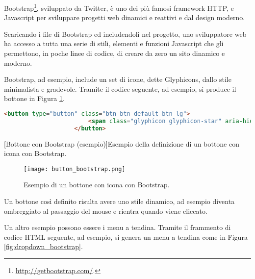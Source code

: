             Bootstrap\footnote{\url{http://getbootstrap.com/}.}, sviluppato da Twitter, è uno dei più famosi framework \ac{HTTP},  e Javascript per sviluppare progetti web dinamici e reattivi e dal design moderno.
            
            Scaricando i file di Bootstrap ed includendoli nel progetto, uno sviluppatore web ha accesso a tutta una serie di stili, elementi  e funzioni Javascript che gli permettono, in poche linee di codice, di creare da zero un sito dinamico e moderno.
            
            Bootstrap, ad esempio, include un set di icone, dette Glyphicons, dallo stile minimalista e gradevole. Tramite il codice seguente, ad esempio, si produce il bottone in Figura \ref{fig:button_bootstrap}.
            
            \begin{center}
                \begin{lstlisting}[language=html, gobble=18]
                    <button type="button" class="btn btn-default btn-lg">
                        <span class="glyphicon glyphicon-star" aria-hidden="true"></span> Star
                    </button>
                \end{lstlisting}
                \captionsetup{textformat=empty,labelformat=empty} \vspace{-2em}
                [Bottone con Bootstrap (esempio)]{Esempio della definizione di un bottone con icona con Bootstrap.}
            \end{center}
            
        	\begin{figure}[h!]
        		\begin{center}
        			\texttt{[image: button\_bootstrap.png]}
        		\end{center}
        		\caption[Bottone con Bootstrap (esempio)]{Esempio di un bottone con icona con Bootstrap.}
        		\label{fig:button_bootstrap}
        	\end{figure}
        	
        	Un bottone così definito risulta avere uno stile dinamico, ad esempio diventa ombreggiato al passaggio del mouse e rientra quando viene cliccato.
        	
        	Un altro esempio possono essere i menu a tendina. Tramite il frammento di codice \ac{HTML} seguente, ad esempio, si genera un menu a tendina come in Figura \ref{fig:dropdown_bootstrap}.
        	
